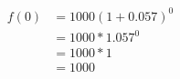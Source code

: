 \documentclass[preview]{standalone}
\begin{document}
\begin{align*}
f(0) &= 1000(1 +0.057)^0\\  &=1000*1.057^0 \\ &=1000*1\\ &=1000
\end{align*}
\end{document}
